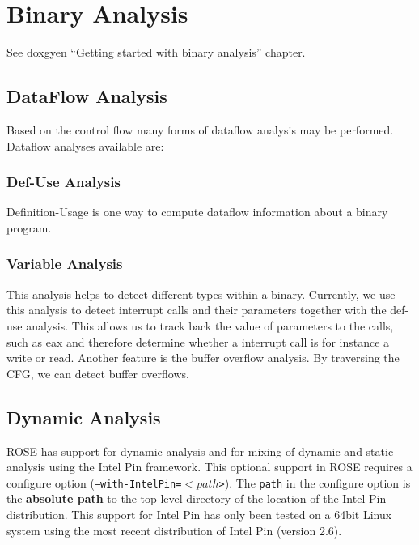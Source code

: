 \chapter{Binary Analysis}


See doxgyen ``Getting started with binary analysis'' chapter.

\section{DataFlow Analysis}


Based on the control flow many forms of dataflow analysis may be performed.
Dataflow analyses available are:
 
\subsection{Def-Use Analysis}

Definition-Usage is one way to compute dataflow information about a binary program.

\subsection{Variable Analysis}

This analysis helps to detect different types within a binary.
Currently, we use this analysis to detect interrupt calls and their parameters together with the def-use analysis.
This allows us to track back the value of parameters to the calls, such as eax and therefore 
determine whether a interrupt call is for instance a write or read.
Another feature is the buffer overflow analysis. By traversing the CFG, we can detect buffer overflows.


\section{Dynamic Analysis}

   ROSE has support for dynamic analysis and for mixing of dynamic
and static analysis using the Intel Pin framework. This optional support in ROSE
requires a configure option ({\tt --with-IntelPin=$<path$>}).  The {\tt path} in
the configure option is the {\bf absolute path} to the top level directory of the location of
the Intel Pin distribution.  This support for Intel Pin has only been tested
on a 64bit Linux system using the most recent distribution of Intel Pin (version 2.6).

